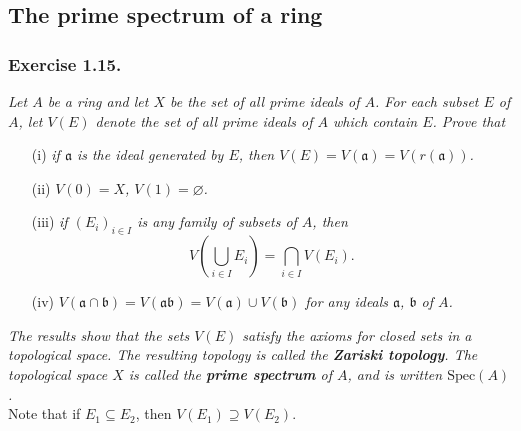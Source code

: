 \documentclass{article}
\begin{document}



\subsection*{The prime spectrum of a ring \\}



\subsubsection*{Exercise 1.15.}
\emph{Let $A$ be a ring and let $X$ be the set of all prime ideals of $A$.
For each subset $E$ of $A$,
let $V(E)$ denote the set of all prime ideals of $A$ which contain $E$.
Prove that}
\begin{enumerate}
\item[(i)]
  \emph{if $\mathfrak{a}$ is the ideal generated by $E$,
  then $V(E) = V(\mathfrak{a}) = V(r(\mathfrak{a}))$.}

\item[(ii)]
  \emph{$V(0) = X$, $V(1) = \varnothing$.}

\item[(iii)]
  \emph{if $(E_i)_{i \in I}$ is any family of subsets of $A$,
  then
  $$V\left( \bigcup_{i \in I}E_i \right) = \bigcap_{i \in I} V(E_i).$$}

\item[(iv)]
  \emph{$V(\mathfrak{a} \cap \mathfrak{b})
  = V(\mathfrak{a} \mathfrak{b})
  = V(\mathfrak{a}) \cup V(\mathfrak{b})$
  for any ideals $\mathfrak{a}$, $\mathfrak{b}$ of $A$.}
\end{enumerate}


\emph{The results show that the sets $V(E)$ satisfy
the axioms for closed sets in a topological space.
The resulting topology is called the \textbf{Zariski topology}.
The topological space $X$ is called the \textbf{prime spectrum} of $A$,
and is written $\mathrm{Spec}(A)$.} \\



Note that if $E_1 \subseteq E_2$,
then $V(E_1) \supseteq V(E_2)$. \\
\end{document}
